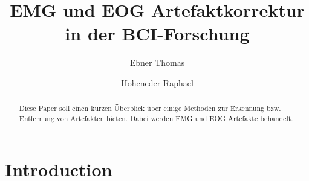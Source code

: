 \documentclass[preprint,12pt]{elsarticle}
\begin{document}
\begin{frontmatter}



\title{EMG und EOG Artefaktkorrektur in der BCI-Forschung}


\author{Ebner Thomas}
\author{Hoheneder Raphael}
\address{Graz University of Technology, Austria}

\begin{abstract}

Diese Paper soll einen kurzen Überblick über einige Methoden zur Erkennung bzw. Entfernung von Artefakten bieten.
Dabei werden EMG und EOG Artefakte behandelt.
\end{abstract}

\begin{keyword}


\end{keyword}

\end{frontmatter}


\section{Introduction}
\label{Introduction}
\end{document}
